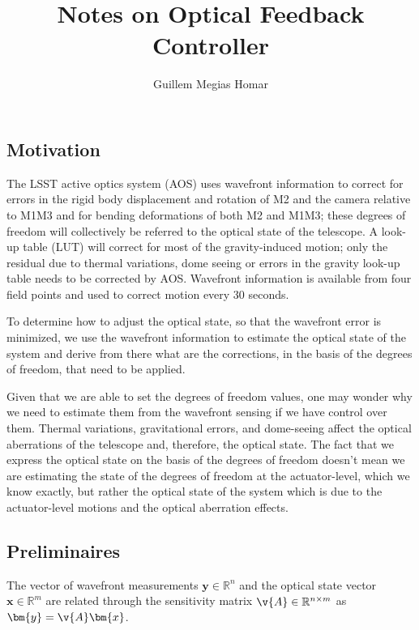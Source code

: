 \documentclass[SE,authoryear,toc]{lsstdoc}
\title{Notes on Optical Feedback Controller}
\author{%
Guillem Megias Homar
}
\date{\vcsDate}
\begin{document}
\mkshorttitle


\subsection*{Motivation}
The LSST active optics system (AOS) uses wavefront information to correct for errors in the rigid body displacement and rotation of M2 and the camera relative to M1M3 and for bending deformations of both M2 and M1M3; these degrees of freedom will collectively be referred to the optical state of the telescope. A look-up table (LUT) will correct for most of the gravity-induced motion; only the residual due to thermal variations, dome seeing or errors in the gravity look-up table needs to be corrected by AOS. Wavefront information is available from four field points and used to correct motion every 30 seconds. 

To determine how to adjust the optical state, so that the wavefront error is minimized, we use the wavefront information to estimate the optical state of the system and derive from there what are the corrections, in the basis of the degrees of freedom, that need to be applied.

Given that we are able to set the degrees of freedom values, one may wonder why we need to estimate them from the wavefront sensing if we have control over them. Thermal variations, gravitational errors, and dome-seeing affect the optical aberrations of the telescope and, therefore, the optical state. The fact that we express the optical state on the basis of the degrees of freedom doesn't mean we are estimating the state of the degrees of freedom at the actuator-level, which we know exactly, but rather the optical state of the system which is due to the actuator-level motions and the optical aberration effects. 

\subsection*{Preliminaires}
The vector of wavefront measurements $\bm{y} \in \mathbb{R}^n$ and the optical state vector  $\bm{x} \in \mathbb{R}^m$ are related through the sensitivity matrix $\v{A} \in \mathbb{R}^{n \times m}$ as $\bm{y} = \v{A} \bm{x}$. 
\end{document}
